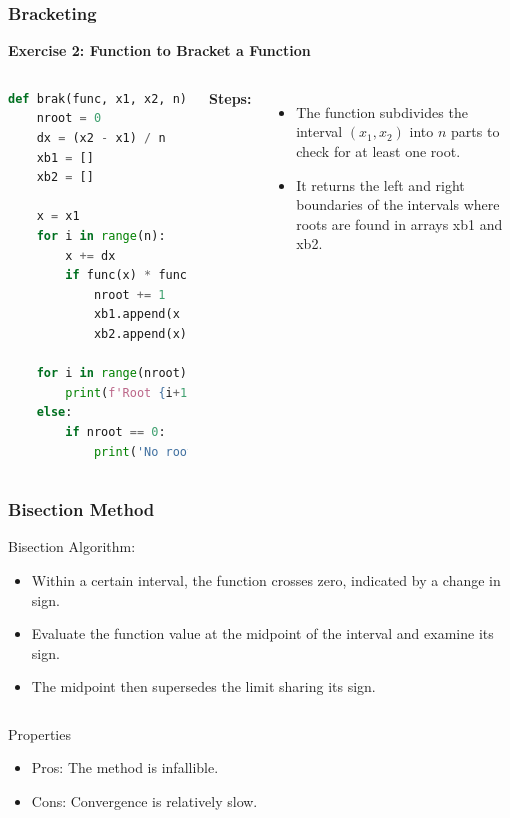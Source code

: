   \begin{frame}[fragile]
    \frametitle{Bracketing}
    
    \textbf{Exercise 2: Function to Bracket a Function}
    \begin{columns}
    \begin{lstlisting}[language=Python,basicstyle=\scriptsize]
def brak(func, x1, x2, n):
    nroot = 0
    dx = (x2 - x1) / n
    xb1 = []
    xb2 = []

    x = x1
    for i in range(n):
        x += dx
        if func(x) * func(x - dx) <= 0:
            nroot += 1
            xb1.append(x - dx)
            xb2.append(x)

    for i in range(nroot):
        print(f'Root {i+1} in bracketing interval [{xb1[i]}, {xb2[i]}]')
    else:
        if nroot == 0:
            print('No roots found!')
    \end{lstlisting}
    \textbf{Steps:}
    \begin{itemize}
      \item The function subdivides the interval \((x_1, x_2)\) into \(n\) parts to check for at least one root.
      \item It returns the left and right boundaries of the intervals where roots are found in arrays xb1 and xb2.
    \end{itemize}
  \end{columns}
  \end{frame}
  
  \begin{frame}[fragile]
    \frametitle{Bisection Method}
  
    Bisection Algorithm:
    \begin{itemize}
      \item Within a certain interval, the function crosses zero, indicated by a change in sign.
      \item Evaluate the function value at the midpoint of the interval and examine its sign.
      \item The midpoint then supersedes the limit sharing its sign.
    \end{itemize}
  
    \begin{columns}
    \vspace{0.5cm}
    \centering
    
  
    \begin{block}{Properties}
    \begin{itemize}
      \item Pros: The method is infallible.
      \item Cons: Convergence is relatively slow.
    \end{itemize}
  \end{block}
  \end{columns}
  \end{frame}
  

